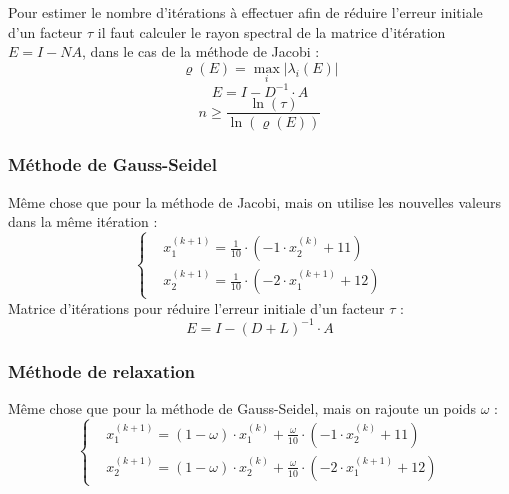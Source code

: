 Pour estimer le nombre d'itérations à effectuer afin de réduire l'erreur initiale
d'un facteur $\tau$ il faut calculer le rayon spectral de la matrice d'itération
$E=I-NA$, dans le cas de la méthode de Jacobi :
\begin{equation}
    \varrho(E)=\max_i\left |\lambda_i(E) \right |
    \nonumber
\end{equation}
\begin{equation}
    E=I-D^{-1}\cdot A
    \nonumber
\end{equation}
\begin{equation}
    n \geq \frac{\ln(\tau)}{\ln(\varrho(E))}
    \nonumber
\end{equation}
\subsubsection*{Méthode de Gauss-Seidel}
\noindent
Même chose que pour la méthode de Jacobi, mais on utilise les nouvelles valeurs
dans la même itération :
\begin{equation}
    \left\{\begin{aligned}
         & x_1^{(k+1)}=\frac{1}{10}\cdot(-1\cdot x_2^{(k)}+11)   \\
         & x_2^{(k+1)}=\frac{1}{10}\cdot(-2\cdot x_1^{(k+1)}+12)
    \end{aligned}\right.
    \nonumber
\end{equation}
Matrice d'itérations pour réduire l'erreur initiale d'un facteur $\tau$ :
\begin{equation}
    E = I-(D+L)^{-1}\cdot A
    \nonumber
\end{equation}
\subsubsection*{Méthode de relaxation}
\noindent
Même chose que pour la méthode de Gauss-Seidel, mais on rajoute un poids $\omega$ :
\begin{equation}
    \left\{\begin{aligned}
         & x_1^{(k+1)}=(1-\omega)\cdot x_1^{(k)}+\frac{\omega}{10}\cdot(-1\cdot x_2^{(k)}+11)   \\
         & x_2^{(k+1)}=(1-\omega)\cdot x_2^{(k)}+\frac{\omega}{10}\cdot(-2\cdot x_1^{(k+1)}+12)
    \end{aligned}\right.
    \nonumber
\end{equation}
